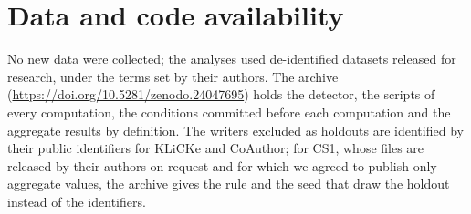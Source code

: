 \section*{Data and code availability}
\label{sec:availability}

No new data were collected; the analyses used de-identified datasets released for research, under the terms set by their authors. The
archive (\url{https://doi.org/10.5281/zenodo.24047695}) holds the detector, the scripts of every computation, the conditions
committed before each computation and the aggregate results by definition. The writers excluded as holdouts are
identified by their public identifiers for KLiCKe and CoAuthor; for CS1, whose files are released by their authors on
request and for which we agreed to publish only aggregate values, the archive gives the rule and the seed that draw
the holdout instead of the identifiers.
